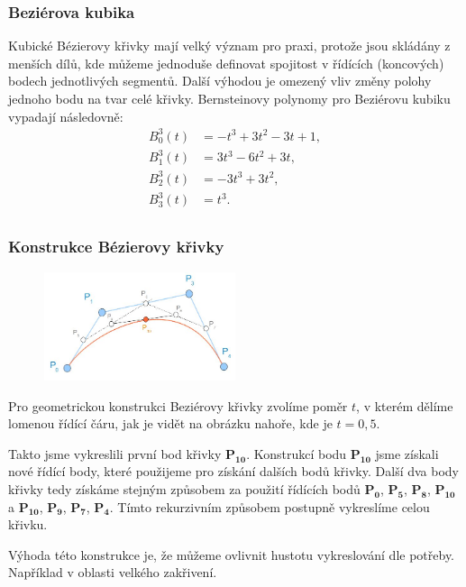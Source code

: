 \subsubsection{Beziérova kubika}
Kubické Bézierovy křivky mají velký význam pro praxi, protože jsou skládány z menších dílů, kde můžeme jednoduše definovat spojitost v řídících (koncových) bodech jednotlivých segmentů. Další výhodou je omezený vliv změny polohy jednoho bodu na tvar celé křivky. Bernsteinovy polynomy pro Beziérovu kubiku vypadají následovně:
\begin{equation*} \label{rovnice_bezier_kubika}
\begin{split}
B_0^3(t) &= -t^3 + 3t^2 - 3t + 1,\\
B_1^3(t) &= 3t^3 - 6t^2 + 3t,\\
B_2^3(t) &= -3t^3 + 3t^2,\\
B_3^3(t) &= t^3.\\
\end{split}
\end{equation*}

\subsubsection{Konstrukce Bézierovy křivky}
\begin{figure}[H]
\centering
\includegraphics[width=0.5\textwidth]{assets/2_bezier_ex}
\end{figure}
Pro geometrickou konstrukci Beziérovy křivky zvolíme poměr $ t $, v kterém dělíme lomenou řídící čáru, jak je vidět na obrázku nahoře, kde je $t=0,5$. 

Takto jsme vykreslili první bod křivky $\mathbf{P_10}$. Konstrukcí bodu $\mathbf{P_10}$ jsme získali nové řídící body, které použijeme pro získání dalších bodů křivky. Další dva body křivky tedy získáme stejným způsobem za použití řídících bodů {$\mathbf{P_0}$, $\mathbf{P_5}$, $\mathbf{P_8}$, $\mathbf{P_10}$} a {$\mathbf{P_10}$, $\mathbf{P_9}$, $\mathbf{P_7}$, $\mathbf{P_4}$}. Tímto rekurzivním způsobem postupně vykreslíme celou křivku.

Výhoda této konstrukce je, že můžeme ovlivnit hustotu vykreslování dle potřeby. Například v oblasti velkého zakřivení.

